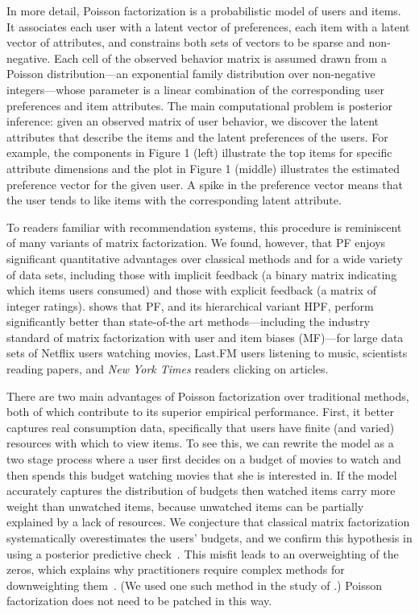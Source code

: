 In more detail, Poisson factorization is a probabilistic model of
users and items.  It associates each user with a latent vector of
preferences, each item with a latent vector of attributes, and
constrains both sets of vectors to be sparse and non-negative.  Each
cell of the observed behavior matrix is assumed drawn from a Poisson
distribution---an exponential family distribution over non-negative
integers---whose parameter is a linear combination of the
corresponding user preferences and item attributes.  The main
computational problem is posterior inference: given an observed matrix
of user behavior, we discover the latent attributes that describe the
items and the latent preferences of the users.  For example, the
components in Figure 1 (left) illustrate the top items for specific
attribute dimensions and the plot in Figure 1 (middle) illustrates the
estimated preference vector for the given user.  A spike in the
preference vector means that the user tends to like items with the
corresponding latent attribute.

To readers familiar with recommendation systems, this procedure is
reminiscent of many variants of matrix factorization.  We found,
however, that PF enjoys significant quantitative advantages over
classical methods and for a wide variety of data sets, including those
with implicit feedback (a binary matrix indicating which items users
consumed) and those with explicit feedback (a matrix of integer
ratings).   shows that PF, and its hierarchical variant
HPF, perform significantly better than state-of-the art
methods---including the industry standard of matrix factorization with
user and item biases (MF)---for large data sets of Netflix users
watching movies, Last.FM users listening to music, scientists reading
papers, and \textit{New York Times} readers clicking on articles.


There are two main advantages of Poisson factorization over
traditional methods, both of which contribute to its superior
empirical performance.  First, it better captures real consumption
data, specifically that users have finite (and varied) resources with
which to view items.  To see this, we can rewrite the model as a two
stage process where a user first decides on a budget of movies to
watch and then spends this budget watching movies that she is
interested in.  If the model accurately captures the distribution of
budgets then watched items carry more weight than unwatched items,
because unwatched items can be partially explained by a lack of
resources. We conjecture that classical matrix factorization
systematically overestimates the users' budgets, and we confirm this
hypothesis in  using a posterior predictive
check~\cite{Gelman:1996}.  This misfit leads to an overweighting of
the zeros, which explains why practitioners require complex methods
for downweighting
them~\cite{Hu:2008p9402,Gantner:2012p9364,Dror:2012a,Paquet:2013p9197}.
(We used one such method in the study of .)  Poisson
factorization does not need to be patched in this way.

